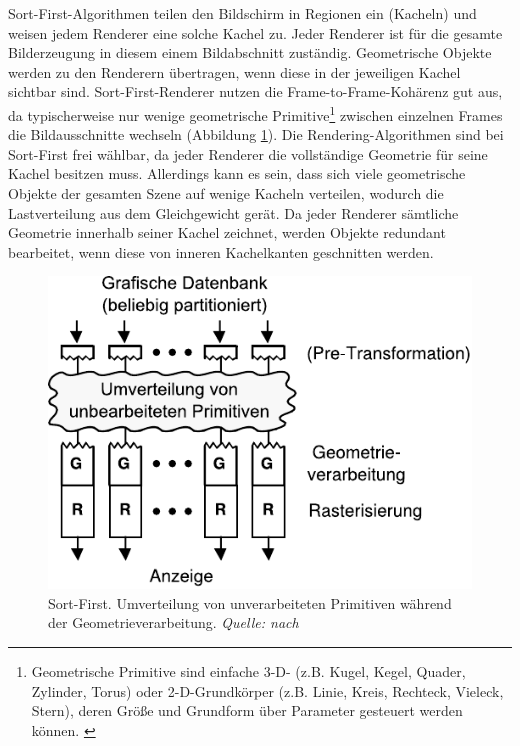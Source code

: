 Sort-First-Algorithmen teilen den Bildschirm in Regionen ein (Kacheln) und weisen jedem Renderer eine solche Kachel zu. Jeder Renderer ist für die gesamte Bilderzeugung in diesem einem Bildabschnitt zuständig. Geometrische Objekte werden zu den Renderern übertragen, wenn diese in der jeweiligen Kachel sichtbar sind. Sort-First-Renderer nutzen die Frame-to-Frame-Kohärenz gut aus, da typischerweise nur wenige geometrische Primitive\footnote{Geometrische Primitive sind einfache 3-D- (z.B. Kugel, Kegel, Quader, Zylinder, Torus) oder 2-D-Grundkörper (z.B. Linie, Kreis, Rechteck, Vieleck, Stern), deren Größe und Grundform über Parameter gesteuert werden können. \cite{medieninfo}} zwischen einzelnen Frames die Bildausschnitte wechseln (Abbildung \ref{fig:relwork:sortfirst}). Die Rendering-Algorithmen sind bei Sort-First frei wählbar, da jeder Renderer die vollständige Geometrie für seine Kachel besitzen muss. Allerdings kann es sein, dass sich viele geometrische Objekte der gesamten Szene auf wenige Kacheln verteilen, wodurch die Lastverteilung aus dem Gleichgewicht gerät. Da jeder Renderer sämtliche Geometrie innerhalb seiner Kachel zeichnet, werden Objekte redundant bearbeitet, wenn diese von inneren Kachelkanten geschnitten werden.
\begin{figure}
 \centering
  \includegraphics[scale=0.8]{images/sort-first.pdf}
  \caption{Sort-First. Umverteilung von unverarbeiteten Primitiven während der Geometrieverarbeitung. \textit{Quelle: nach \cite{molnar}}}
 \label{fig:relwork:sortfirst}
\end{figure}

